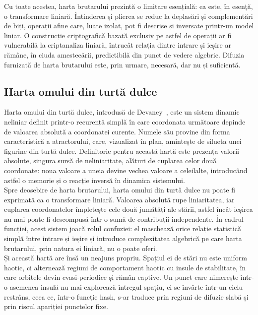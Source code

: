 Cu toate acestea, harta brutarului prezintă o limitare esențială: ea este, în esență, o transformare liniară.
Întinderea și plierea se reduc la deplasări și complementări de biți, operații afine care, luate izolat, pot fi descrise și inversate printr-un model liniar.
O construcție criptografică bazată exclusiv pe astfel de operații ar fi vulnerabilă la criptanaliza liniară, întrucât relația dintre intrare și ieșire ar rămâne, în ciuda amestecării, predictibilă din punct de vedere algebric.
Difuzia furnizată de harta brutarului este, prin urmare, necesară, dar nu și suficientă. \\

\subsection{Harta omului din turtă dulce}

Harta omului din turtă dulce, introdusă de Devaney~\cite{devaney1989}, este un sistem dinamic neliniar definit printr-o recurență simplă în care coordonata următoare depinde de valoarea absolută a coordonatei curente.
Numele său provine din forma caracteristică a atractorului, care, vizualizat în plan, amintește de silueta unei figurine din turtă dulce.
Definitorie pentru această hartă este prezența valorii absolute, singura sursă de neliniaritate, alături de cuplarea celor două coordonate: noua valoare a uneia devine vechea valoare a celeilalte, introducând astfel o memorie și o reacție inversă în dinamica sistemului. \\

Spre deosebire de harta brutarului, harta omului din turtă dulce nu poate fi exprimată ca o transformare liniară.
Valoarea absolută rupe liniaritatea, iar cuplarea coordonatelor împletește cele două jumătăți ale stării, astfel încât ieșirea nu mai poate fi descompusă într-o sumă de contribuții independente.
În cadrul funcției, acest sistem joacă rolul confuziei: el maschează orice relație statistică simplă între intrare și ieșire și introduce complexitatea algebrică pe care harta brutarului, prin natura ei liniară, nu o poate oferi. \\

Și această hartă are însă un neajuns propriu.
Spațiul ei de stări nu este uniform haotic, ci alternează regiuni de comportament haotic cu insule de stabilitate, în care orbitele devin cvasi-periodice și rămân captive.
Un punct care nimerește într-o asemenea insulă nu mai explorează întregul spațiu, ci se învârte într-un ciclu restrâns, ceea ce, într-o funcție hash, s-ar traduce prin regiuni de difuzie slabă și prin riscul apariției punctelor fixe. \\

